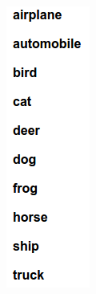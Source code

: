 \documentclass{beamer}
\begin{document}
\begin{frame}
\begin{columns}
\begin{column}{.2\textwidth}
\includegraphics[width=\linewidth]{label.png}
\end{column}
\end{columns}
\end{frame}
\end{document}

